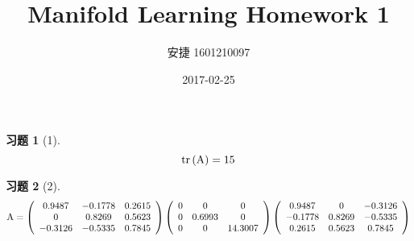 \documentclass[12pt, oneside]{article}
\title{Manifold Learning Homework 1}
\author{安捷 1601210097}
\date{2017-02-25}
\newtheorem*{exercise}{\textbf{习题}}
\begin{document}
\maketitle

\begin{exercise}[1]
	\begin{equation*}
		\operatorname{tr}\left(\rm{A} \right) = 15
	\end{equation*}
\end{exercise}

\begin{exercise}[2]
	\scriptsize
	\begin{equation*}
		\rm{A} =
		\left(
		\begin{array}{ccc}
			0.9487  & -0.1778 & 0.2615 \\
			0       & 0.8269  & 0.5623 \\
			-0.3126 & -0.5335 & 0.7845 \\
		\end{array}
		\right)
		\left(
		\begin{array}{ccc}
			0 & 0      & 0       \\
			0 & 0.6993 & 0       \\
			0 & 0      & 14.3007 \\
		\end{array}
		\right)
		\left(
		\begin{array}{ccc}
			0.9487  & 0      & -0.3126 \\
			-0.1778 & 0.8269 & -0.5335 \\
			0.2615  & 0.5623 & 0.7845  \\
		\end{array}
		\right)
	\end{equation*}
\end{exercise}
\end{document}
